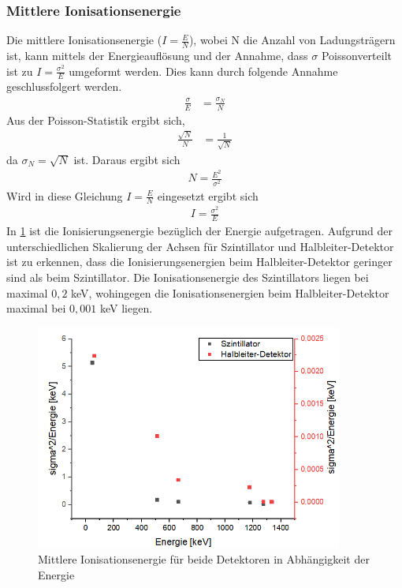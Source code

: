 \subsubsection{Mittlere Ionisationsenergie}
Die mittlere Ionisationsenergie ($I = \frac{E}{N}$), wobei N die Anzahl von Ladungsträgern ist, kann mittels der Energieauflösung und der Annahme, dass $\sigma$ Poissonverteilt ist zu $I = \frac{\sigma^2}{E}$ umgeformt werden. Dies kann durch folgende Annahme geschlussfolgert werden.
\begin{align}
	\frac{\sigma}{E} &= \frac{\sigma_N}{N}
\end{align}
Aus der Poisson-Statistik ergibt sich, 
\begin{align}
	\frac{\sqrt{N}}{N} &= \frac{1}{\sqrt{N}}
\end{align}
da $\sigma_N = \sqrt{N}$ ist.
Daraus ergibt sich 
\begin{align}
	N = \frac{E^2}{\sigma^2}
\end{align}
Wird in diese Gleichung $I = \frac{E}{N}$ eingesetzt ergibt sich 
\begin{align}
	I = \frac{\sigma^2}{E}
\end{align}
In \cref{sig2} ist die Ionisierungsenergie bezüglich der Energie aufgetragen. Aufgrund der unterschiedlichen Skalierung der Achsen für Szintillator und Halbleiter-Detektor ist zu erkennen, dass die Ionisierungsenergien beim Halbleiter-Detektor geringer sind als beim Szintillator. Die Ionisationsenergie des Szintillators liegen bei maximal $0,2$ keV, wohingegen die Ionisationsenergien beim Halbleiter-Detektor maximal bei $0,001$ keV liegen.
\begin{figure}[h!]
	\centering
	\includegraphics[width=0.9\textwidth]{sigma2.png}
	\caption{Mittlere Ionisationsenergie für beide Detektoren in Abhängigkeit der Energie}
	\label{sig2}
\end{figure}
